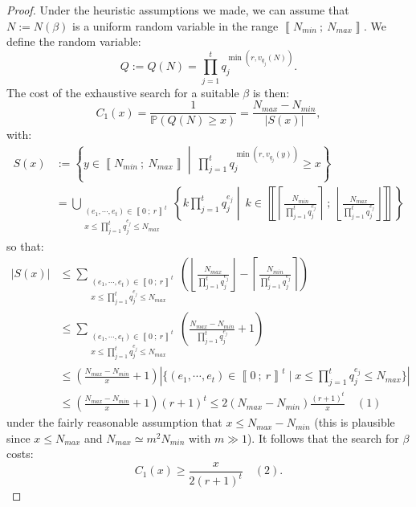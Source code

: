 \documentclass[a4paper,10pt]{report}
\theoremstyle{definition}
\theoremstyle{plain}
\theoremstyle{definition}
\renewcommand{\i}[2]{\left\llbracket #1~;~#2\right\rrbracket}
\renewcommand{\(}{\left(}
\renewcommand{\)}{\right)}
\renewcommand{\P}{\mathbb{P}}
\begin{document}
\begin{proof}
Under the heuristic assumptions we made, we can assume that $N:=N(\beta)$ is a uniform random variable in the range $\i{N_{min}}{N_{max}}$.  We define the random variable:
\[Q:=Q(N)=\prod_{j=1}^t q_j^{\min(r,v_{q_j}(N))}.\]
The cost of the exhaustive search for a suitable $\beta$ is then:
\[C_1(x)=\frac{1}{\P(Q(N)\geq x)}=\frac{N_{max}-N_{min}}{|S(x)|},\]
with:
\begin{align*}S(x)&:=\left\{y\in\i{N_{min}}{N_{max}}\middle | \ \prod_{j=1}^t q_j^{\min(r,v_{q_j}(y))}\geq x\right\}\\
&=\bigcup_{\substack{(e_1, \cdots, e_t)\in\i{0}{r}^t\\x\leq \prod_{j=1}^t q_j^{e_j}\leq N_{max}}}\left\{k\prod_{j=1}^t q_j^{e_j}\middle | \ k\in\i{\left\lceil\frac{N_{min}}{\prod_{j=1}^t q_j^{e_j}}\right\rceil}{\left\lfloor\frac{N_{max}}{\prod_{j=1}^t q_j^{e_j}}\right\rfloor}\right\}
\end{align*}
so that:
\begin{align*}
|S(x)|&\leq \sum_{\substack{(e_1, \cdots, e_t)\in\i{0}{r}^t\\x\leq \prod_{j=1}^t q_j^{e_j}\leq N_{max}}}\(\left\lfloor\frac{N_{max}}{\prod_{j=1}^t q_j^{e_j}}\right\rfloor-\left\lceil\frac{N_{min}}{\prod_{j=1}^t q_j^{e_j}}\right\rceil\)\\
&\leq \sum_{\substack{(e_1, \cdots, e_t)\in\i{0}{r}^t\\x\leq \prod_{j=1}^t q_j^{e_j}\leq N_{max}}}\(\frac{N_{max}-N_{min}}{\prod_{j=1}^t q_j^{e_j}}+1\)\\
&\leq\(\frac{N_{max}-N_{min}}{x}+1\)|\{(e_1, \cdots, e_t)\in\i{0}{r}^t\mid x\leq \prod_{j=1}^t q_j^{e_j}\leq N_{max}\}|\\
&\leq\(\frac{N_{max}-N_{min}}{x}+1\)(r+1)^t\leq 2(N_{max}-N_{min})\frac{(r+1)^t}{x} \quad (1)
\end{align*}
under the fairly reasonable assumption that $x\leq N_{max}-N_{min}$ (this is plausible since $x\leq N_{max}$ and $N_{max}\simeq m^2 N_{min}$ with $m\gg 1$). It follows that the search for $\beta$ costs:
\[C_1(x)\geq  \frac{x}{2(r+1)^t}\quad (2).\]


\end{proof}
\end{document}
